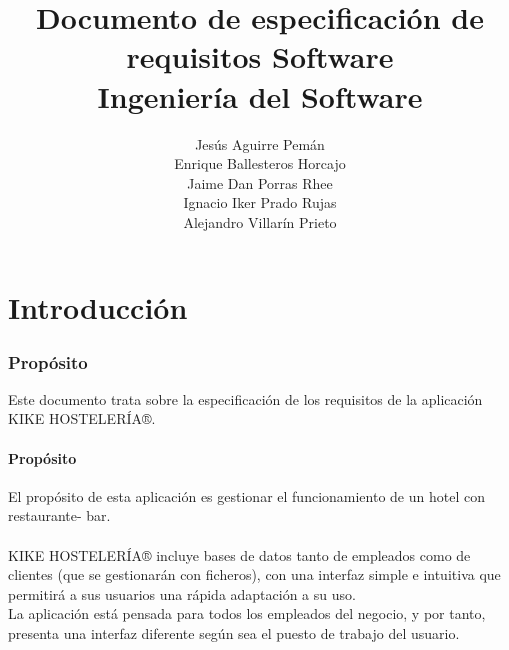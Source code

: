 \documentclass[spanish,a4paper,12pt]{report}	%
\begin{document}
\title{\textbf{\huge{Documento de especificación de \\ 
	requisitos Software}} \\ \vspace{0.3cm}
	\Large{Ingeniería del Software}}
\author{ Jesús Aguirre Pemán \\
	 Enrique Ballesteros Horcajo \\
	 Jaime Dan Porras Rhee \\
	 Ignacio Iker Prado Rujas \\
	 Alejandro Villarín Prieto }
\date{\Today}
\maketitle

\newpage
\mbox{}
\thispagestyle{empty}						%
\newpage


\tableofcontents 							%

\newpage
\mbox{}
\thispagestyle{empty}						%
\newpage


\part{Introducción}
\section{Propósito}
 	Este documento trata sobre la especificación de los requisitos de la aplicación KIKE HOSTELERÍA®.
		\subsection{Propósito} El propósito de esta aplicación es gestionar el funcionamiento de un hotel con restaurante- bar. \\\\
KIKE HOSTELERÍA® incluye bases de datos tanto de empleados como de clientes (que se gestionarán con ficheros), con una interfaz simple e intuitiva que permitirá a sus usuarios una rápida adaptación a su uso.\\

La aplicación está pensada para todos los empleados del negocio, y por tanto, presenta una interfaz diferente según sea el puesto de trabajo del usuario.\\
\end{document}
